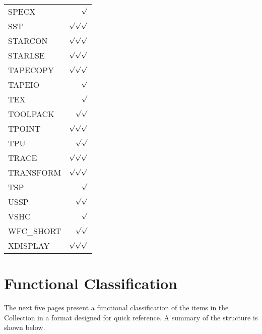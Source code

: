 \begin{center}
\begin{tabular}{||l|r||}
SPECX     & $\surd$ \\
SST       & $\surd\surd\surd$ \\
STARCON   & $\surd\surd\surd$ \\
STARLSE   & $\surd\surd\surd$ \\
TAPECOPY  & $\surd\surd\surd$ \\
TAPEIO    & $\surd$ \\
TEX       & $\surd$ \\
TOOLPACK  & $\surd\surd$ \\
TPOINT    & $\surd\surd\surd$ \\
TPU       & $\surd\surd$ \\
TRACE     & $\surd\surd\surd$ \\
TRANSFORM & $\surd\surd\surd$ \\
TSP       & $\surd$ \\
USSP      & $\surd\surd$ \\
VSHC      & $\surd$ \\
WFC\_SHORT & $\surd\surd$ \\
XDISPLAY  & $\surd\surd\surd$ \\
\hline
\end{tabular}
\end{center}

\newpage
\onecolumn
\normalsize

\section{Functional Classification}

The next five pages present a functional classification of the items in the
Collection in a format designed for quick reference.
A summary of the structure is shown below.

\vspace{5mm}

\small

